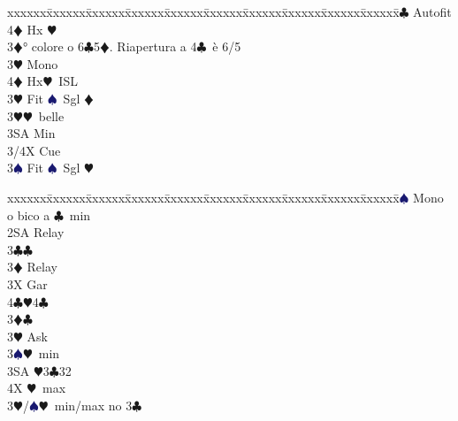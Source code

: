 \documentclass[a4paper,italian]{article}
\newcommand{\BC}{\textcolor{OliveGreen}{$\clubsuit$}}
\newcommand{\BD}{\textcolor{RedOrange}{$\vardiamondsuit$}}
\newcommand{\BH}{\textcolor{Red2}{$\varheartsuit${}}}
\newcommand{\BS}{\textcolor{MidnightBlue}{$\spadesuit${}}}
\newenvironment{bidtable}
{\begin{tabbing}

    xxxxxx\=xxxxxx\=xxxxxx\=xxxxxx\=xxxxxx\=xxxxxx\=xxxxxx\=xxxxxx\=xxxxxx\=xxxxxx\=\kill}
{\end{tabbing} }%
\begin{document}
\begin{multicols}{2}
\begin{bidtable}
                                            4\BC \> Autofit\\
                                            4\BD \> Hx \BH \-\-\\
                                            3\BD {}° colore o 6\BC 5\BD . Riapertura a 4\BC\ è 6/5\+\\
                                            3\BH \> Mono\+\\
                                            4\BD \> Hx\BH\ ISL\-\-\\
                                            3\BH \> Fit \BS\ Sgl \BD \+\\
                                            3\BH {}\BH\ belle\\
                                            3SA \> Min\\
                                            3/4X \> Cue\-\\
                                            3\BS \> Fit \BS\ Sgl \BH \-\\
                                        \end{bidtable}
                                        \columnbreak
                                        \begin{bidtable}
                                            2\BS \> Mono o bico a \BC\ min\+\\
                                            2SA \> Relay\+\\
                                            3\BC {}\BC \+\\
                                            3\BD \> Relay\+\\
                                            3X \> Gar\\
                                            4\BC {}\BH 4\BC \-\-\\
                                            3\BD {}\BC \+\\
                                            3\BH \> Ask\+\\
                                            3\BS {}\BH\ min\\
                                            3SA \BH 3\BC 32\\
                                            4X \BH\ max\-\-\\
                                            3\BH/\BS {}\BH\ min/max no 3\BC \\

\end{bidtable}
\end{multicols}
\end{document}
